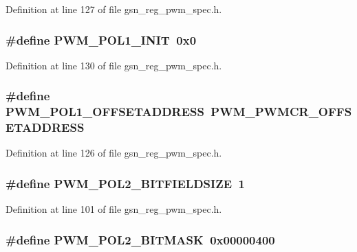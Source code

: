 Definition at line 127 of file gsn\_\-reg\_\-pwm\_\-spec.h.

\hypertarget{a00565_a49ab249dcd99072a3eefbcc15f3c8f43}{
\subsubsection[{PWM\_\-POL1\_\-INIT}]{\setlength{\rightskip}{0pt plus 5cm}\#define PWM\_\-POL1\_\-INIT~0x0}}
\label{a00565_a49ab249dcd99072a3eefbcc15f3c8f43}


Definition at line 130 of file gsn\_\-reg\_\-pwm\_\-spec.h.

\hypertarget{a00565_aac74b5b5be71ba9c30ec30017740bc41}{
\subsubsection[{PWM\_\-POL1\_\-OFFSETADDRESS}]{\setlength{\rightskip}{0pt plus 5cm}\#define PWM\_\-POL1\_\-OFFSETADDRESS~PWM\_\-PWMCR\_\-OFFSETADDRESS}}
\label{a00565_aac74b5b5be71ba9c30ec30017740bc41}


Definition at line 126 of file gsn\_\-reg\_\-pwm\_\-spec.h.

\hypertarget{a00565_a747574ed13e6904f21e60943be324cdc}{
\subsubsection[{PWM\_\-POL2\_\-BITFIELDSIZE}]{\setlength{\rightskip}{0pt plus 5cm}\#define PWM\_\-POL2\_\-BITFIELDSIZE~1}}
\label{a00565_a747574ed13e6904f21e60943be324cdc}


Definition at line 101 of file gsn\_\-reg\_\-pwm\_\-spec.h.

\hypertarget{a00565_aa306f679ffafcc67897c133927dc4910}{
\subsubsection[{PWM\_\-POL2\_\-BITMASK}]{\setlength{\rightskip}{0pt plus 5cm}\#define PWM\_\-POL2\_\-BITMASK~0x00000400}}
\label{a00565_aa306f679ffafcc67897c133927dc4910}



